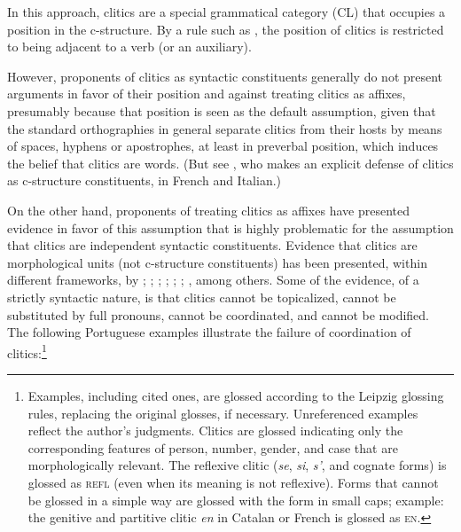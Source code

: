 \documentclass[output=paper,hidelinks]{langscibook}
\begin{document}
\ea\label{ex:Romance:1}
\z
In this approach, clitics are a special grammatical category (CL) that occupies a position in the c-structure. By a rule such as , the position of clitics is restricted to being adjacent to a verb (or an auxiliary). 

However, proponents of clitics as syntactic constituents generally do not pre\-sent arguments in favor of their position and against treating clitics as affixes, presumably because that position is seen as the default assumption, given that the standard orthographies in general separate clitics from their hosts by means of spaces, hyphens or apostrophes, at least in preverbal position, which induces the belief that clitics are words. (But see \citealt{Schwarze2001}, who makes an explicit defense of clitics as c-structure constituents, in French and Italian.)

On the other hand, proponents of treating clitics as affixes have presented evidence in favor of this assumption that is highly problematic for the assumption that clitics are independent syntactic constituents. Evidence that clitics are morphological units (not c-structure constituents) has been presented, within different frameworks, by \citet{Bonet1991,Bonet1995}; \citet{Miller1992}; \citet{Crysmann1997}; \citet{MillerSag1997}; \citet{Monachesi1999}; \citet{LuisSadler2003}; \citet{LuisSpencer2005}, among others. Some of the evidence, of a strictly syntactic nature, is that clitics cannot be topicalized, cannot be substituted by full pronouns, cannot be coordinated, and cannot be modified. The following Portuguese examples illustrate the failure of coordination
of clitics:\footnote{Examples, including cited ones, are glossed according to the Leipzig glossing rules, replacing the original glosses, if necessary. Unreferenced examples reflect the author's judgments. Clitics are glossed indicating only the corresponding features of person, number, gender, and case that are morphologically relevant. The reflexive clitic (\textit{se}, \textit{si}, \textit{s'}, and cognate forms) is glossed as \textsc{refl} (even when its meaning is not reflexive). Forms that cannot be glossed in a simple way are glossed with the form in small caps; example: the genitive and partitive clitic \textit{en} in Catalan or French is glossed as \textsc{en}.}
\end{document}
